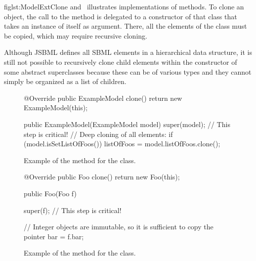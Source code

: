 fig{lst:ModelExtClone} and~ illustrates
implementations of  methods.  To clone an object, the call to
the  method is delegated to a constructor of that class that
takes an instance of itself as argument.  There, all the elements of the
class must be copied, which may require recursive cloning.

Although JSBML defines all SBML elements in a hierarchical data structure, it
is still not possible to recursively clone child elements within the
constructor of some abstract superclasses because these can be of various
types and they cannot simply be organized as a list of children.

\begin{figure}[htb]
  \begin{example}[numbers=left]
@Override public ExampleModel clone() {
  return new ExampleModel(this);
}

public ExampleModel(ExampleModel model) {
  super(model);  // This step is critical!
  // Deep cloning of all elements:
  if (model.isSetListOfFoos()) {
    listOfFoos = model.listOfFoos.clone();
  }
}\end{example}
 \caption{Example of the  method for the  class.}
 \label{lst:ModelExtClone}
\end{figure}

\begin{figure}[htb]
  \begin{example}[numbers=left]
@Override public Foo clone() {
  return new Foo(this);
}

public Foo(Foo f) {
  super(f);  // This step is critical!

  // Integer objects are immutable, so it is sufficient to copy the pointer
  bar = f.bar;
}\end{example}
  \caption{Example of the  method for the  class.}
  \label{lst:ModelExtCloneFoo}
\end{figure}


